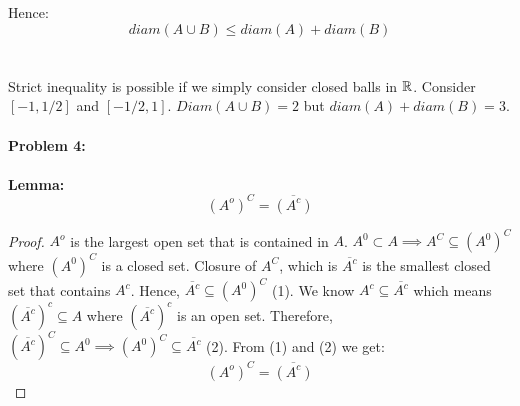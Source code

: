 \documentclass[../Main.tex]{subfiles}
\begin{document}
Hence:
$$diam(A \cup B) \leq diam(A)+diam(B)$$
\\\\ Strict inequality is possible if we simply consider closed balls in $\mathbb R$. Consider $[-1,1/2]$ and $[-1/2,1]$. $Diam(A \cup B)=2$ but $diam(A)+diam(B)=3$.
\\\\ \textbf{Problem 4:}
\\\\ \textbf{Lemma:} $${(A^o)}^C=\overline{(A^c)} $$
\begin{proof}
    $A^o$ is the largest open set that is contained in $A$. $A^0 \subset A \implies A^C \subseteq (A^0)^C$ where $(A^0)^C$ is a closed set. Closure of $A^C$, which is $\overline{A^c}$ is the smallest closed set that contains $A^c$. Hence, $\overline{A^c} \subseteq (A^0)^C$ (1). We know $A^c \subseteq \overline{A^c}$ which means $(\overline{A^c})^c \subseteq A$ where $(\overline{A^c})^c$ is an open set. Therefore, $(\overline{A^c})^C \subseteq A^0 \implies (A^0)^C \subseteq \overline{A^c}$ (2). From (1) and (2) we get:
    $${(A^o)}^C=\overline{(A^c)} $$
\end{proof} 
\end{document}
